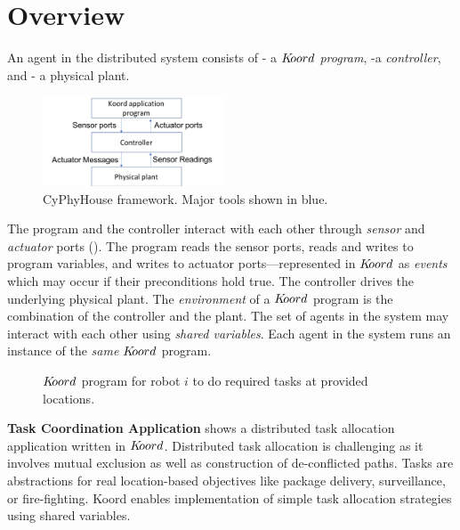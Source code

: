 \section{Overview}
\label{sec:overview}
     An agent in the distributed system consists of -
a $K\kern-2pt oord$ {\em program}, 
-a {\em controller}, and 
- a physical plant.

\begin{figure}[h!]
\centering
\includegraphics[width=0.48\textwidth]{figs/krdarch.png}
\caption{\small CyPhyHouse framework. Major tools shown in blue.}
\label{fig:arch}
\end{figure}
The program and the controller interact with each other through {\em sensor} and {\em actuator} ports ().  The program reads the sensor ports, reads and writes to program variables, and writes to actuator ports---represented in $K\kern-2pt oord$ as \emph{events} which may occur if their preconditions hold true. The controller drives the underlying physical plant. The \emph{environment} of a  $K\kern-2pt oord$ program is the combination of the controller and the plant. The set of agents in the system may interact with each other using {\em shared variables\/}. Each agent in the system runs an instance of the \emph{same} $K\kern-2pt oord$ program. 
\begin{figure}[ht!]
    \noindent
    \begin{center}
        \scriptsize
        {}
        {}
    \end{center}
    \caption{$K\kern-2pt oord$ program for robot $i$ to do required tasks at provided locations.}
    \label{fig:taskapp}
\end{figure}
    
{\bf Task Coordination Application}  shows a distributed task allocation application written in $K\kern-2pt oord$. Distributed task allocation is challenging as it involves mutual exclusion as well as construction of de-conflicted  paths. Tasks are abstractions for real location-based objectives like package delivery, surveillance, or fire-fighting.  Koord enables implementation of simple task allocation strategies using shared variables.

